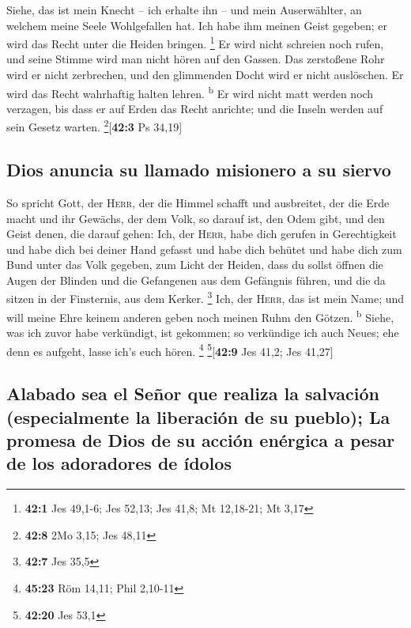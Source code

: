  Siehe, das ist mein Knecht -- ich erhalte ihn -- und mein
Auserwählter, an welchem meine Seele Wohlgefallen hat. Ich habe ihm
meinen Geist gegeben; er wird das Recht unter die Heiden bringen.
\footnote{\textbf{42:1} Jes 49,1-6; Jes 52,13; Jes 41,8; Mt 12,18-21; Mt
  3,17}  Er wird nicht schreien noch rufen, und seine
Stimme wird man nicht hören auf den Gassen.  Das
zerstoßene Rohr wird er nicht zerbrechen, und den glimmenden Docht wird
er nicht auslöschen. Er wird das Recht wahrhaftig halten lehren.
\textsuperscript{b}  Er wird nicht matt werden noch
verzagen, bis dass er auf Erden das Recht anrichte; und die Inseln
werden auf sein Gesetz warten. \footnote{\textbf{42:8} 2Mo 3,15; Jes
  48,11}{[}\textbf{42:3} Ps 34,19{]}

\hypertarget{dios-anuncia-su-llamado-misionero-a-su-siervo}{%
\subsection{Dios anuncia su llamado misionero a su
siervo}\label{dios-anuncia-su-llamado-misionero-a-su-siervo}}

 So spricht Gott, der \textsc{Herr}, der die Himmel
schafft und ausbreitet, der die Erde macht und ihr Gewächs, der dem
Volk, so darauf ist, den Odem gibt, und den Geist denen, die darauf
gehen:  Ich, der \textsc{Herr}, habe dich gerufen in
Gerechtigkeit und habe dich bei deiner Hand gefasst und habe dich
behütet und habe dich zum Bund unter das Volk gegeben, zum Licht der
Heiden,  dass du sollst öffnen die Augen der Blinden und
die Gefangenen aus dem Gefängnis führen, und die da sitzen in der
Finsternis, aus dem Kerker. \footnote{\textbf{42:7} Jes 35,5}
 Ich, der \textsc{Herr}, das ist mein Name; und will meine
Ehre keinem anderen geben noch meinen Ruhm den Götzen.
\textsuperscript{b}  Siehe, was ich zuvor habe verkündigt,
ist gekommen; so verkündige ich auch Neues; ehe denn es aufgeht, lasse
ich's euch hören. \footnote{\textbf{45:23} Röm 14,11; Phil 2,10-11}
\footnote{\textbf{42:20} Jes 53,1}{[}\textbf{42:9} Jes 41,2; Jes
41,27{]}

\hypertarget{alabado-sea-el-seuxf1or-que-realiza-la-salvaciuxf3n-especialmente-la-liberaciuxf3n-de-su-pueblo-la-promesa-de-dios-de-su-acciuxf3n-enuxe9rgica-a-pesar-de-los-adoradores-de-uxeddolos}{%
\subsection{Alabado sea el Señor que realiza la salvación (especialmente
la liberación de su pueblo); La promesa de Dios de su acción enérgica a
pesar de los adoradores de
ídolos}\label{alabado-sea-el-seuxf1or-que-realiza-la-salvaciuxf3n-especialmente-la-liberaciuxf3n-de-su-pueblo-la-promesa-de-dios-de-su-acciuxf3n-enuxe9rgica-a-pesar-de-los-adoradores-de-uxeddolos}}

